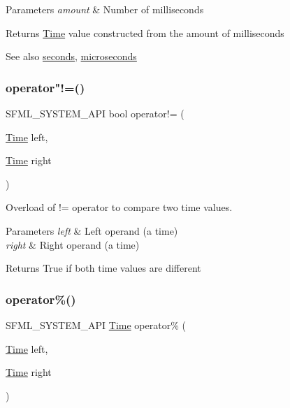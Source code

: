\begin{DoxyParams}{Parameters}
{\em amount} & Number of milliseconds\\
\hline
\end{DoxyParams}
\begin{DoxyReturn}{Returns}
\hyperlink{classsf_1_1_time}{Time} value constructed from the amount of milliseconds
\end{DoxyReturn}
\begin{DoxySeeAlso}{See also}
\hyperlink{classsf_1_1_time_ae36b9ef700f0ed0516abf0194ceb546b}{seconds}, \hyperlink{classsf_1_1_time_a951fd7219641f1e8191887f5dfe0dc31}{microseconds} 
\end{DoxySeeAlso}
\mbox{\label{classsf_1_1_time_ae06b561f6422ec8ca414d400efd2cf4b}} 
\subsubsection{\texorpdfstring{operator"!=()}{operator!=()}}
{\footnotesize\ttfamily S\+F\+M\+L\+\_\+\+S\+Y\+S\+T\+E\+M\+\_\+\+A\+PI bool operator!= (\begin{DoxyParamCaption}\item[{\hyperlink{classsf_1_1_time}{Time}}]{left,  }\item[{\hyperlink{classsf_1_1_time}{Time}}]{right }\end{DoxyParamCaption})\hspace{0.3cm}{\ttfamily [related]}}



Overload of != operator to compare two time values. 


\begin{DoxyParams}{Parameters}
{\em left} & Left operand (a time) \\
\hline
{\em right} & Right operand (a time)\\
\hline
\end{DoxyParams}
\begin{DoxyReturn}{Returns}
True if both time values are different 
\end{DoxyReturn}
\mbox{\label{classsf_1_1_time_aafb8b12fb0ac0e366d6ea9c9e9f93335}} 
\subsubsection{\texorpdfstring{operator\%()}{operator\%()}}
{\footnotesize\ttfamily S\+F\+M\+L\+\_\+\+S\+Y\+S\+T\+E\+M\+\_\+\+A\+PI \hyperlink{classsf_1_1_time}{Time} operator\% (\begin{DoxyParamCaption}\item[{\hyperlink{classsf_1_1_time}{Time}}]{left,  }\item[{\hyperlink{classsf_1_1_time}{Time}}]{right }\end{DoxyParamCaption})\hspace{0.3cm}{\ttfamily [related]}}




